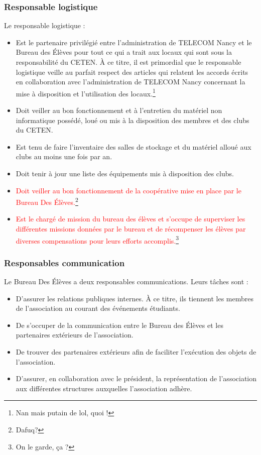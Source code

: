 \documentclass{article} %
\begin{document}
			\subsubsection{Responsable logistique}

				Le responsable logistique :
				\begin{itemize}
					\item Est le partenaire privilégié entre l’administration de
						TELECOM Nancy et le Bureau des Élèves pour tout ce qui a
						trait aux locaux qui sont sous la responsabilité du
						CETEN. À ce titre, il est primordial que le responsable
						logistique veille au parfait respect des articles qui
						relatent les accords écrits en collaboration avec
						l’administration de TELECOM Nancy concernant la mise à
						disposition et l’utilisation des locaux.\footnote{Nan
						mais putain de lol, quoi !}
					\item Doit veiller au bon fonctionnement et à l’entretien du
						matériel non informatique possédé, loué ou mis à la
						disposition des membres et des clubs du CETEN.
					\item Est tenu de faire l’inventaire des salles de stockage
						et du matériel alloué aux clubs au moins une fois par
						an.
					\item Doit tenir à jour une liste des équipements mis à
						disposition des clubs.
					\item \textcolor{red}{Doit veiller au bon fonctionnement de
						la coopérative mise en place par le Bureau Des
						Élèves.}\footnote{Dafuq?}
					\item \textcolor{red}{Est le chargé de mission du bureau
						des élèves et s’occupe de superviser les différentes
						missions données par le bureau et de récompenser les
						élèves par diverses compensations pour leurs efforts
						accomplis.}\footnote{On le garde, ça ?}
				\end{itemize}

			\subsubsection{Responsables communication}

				Le Bureau Des Élèves a deux responsables communications. Leurs
				tâches sont :
				\begin{itemize}
					\item D’assurer les relations publiques internes. À ce
						titre, ils tiennent les membres de l’association au
						courant des événements étudiants.
					\item De s’occuper de la communication entre le Bureau des
						Élèves et les partenaires extérieurs de l’association.
					\item De trouver des partenaires extérieurs afin de
						faciliter l’exécution des objets de l’association.
					\item D’assurer, en collaboration avec le président, la
						représentation de l’association aux différentes
						structures auxquelles l’association adhère. 
				\end{itemize}
\end{document}
